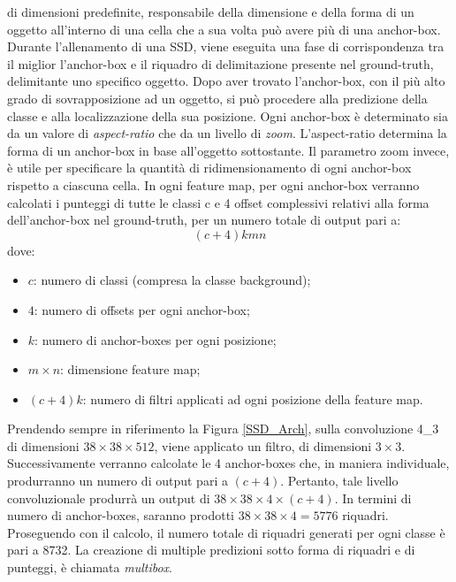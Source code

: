 di dimensioni predefinite, responsabile della dimensione e della forma di 
un oggetto all'interno di una cella che a sua volta può avere più di una 
anchor-box. Durante l'allenamento di una SSD, viene eseguita una fase 
di corrispondenza tra il miglior l'anchor-box e il riquadro di delimitazione 
presente nel ground-truth, delimitante uno specifico oggetto. Dopo aver 
trovato l'anchor-box, con il più alto grado di sovrapposizione ad un oggetto, 
si può procedere alla predizione della classe e alla localizzazione della sua 
posizione. Ogni anchor-box è determinato sia da un valore di \emph{aspect-ratio} che 
da un livello di \emph{zoom}. L'aspect-ratio determina la forma di un anchor-box in 
base all'oggetto sottostante. Il parametro zoom invece, è utile per specificare 
la quantità di ridimensionamento di ogni anchor-box rispetto a ciascuna 
cella. In ogni feature map, per ogni anchor-box verranno calcolati i punteggi 
di tutte le classi c e 4 offset complessivi relativi alla forma dell'anchor-box 
nel ground-truth, per un numero totale di output pari a:
\begin{equation}
    (c+4)kmn
\end{equation}
dove:
\begin{itemize}
    \item $c$: numero di classi (compresa la classe background);
    \item $4$: numero di offsets per ogni anchor-box;
    \item $k$: numero di anchor-boxes per ogni posizione;
    \item $m \times n$: dimensione feature map;
    \item $(c+4)k$: numero di filtri applicati ad ogni posizione della feature map.
\end{itemize}
Prendendo sempre in riferimento la Figura \ref{SSD_Arch}, sulla convoluzione 4\_3 
di dimensioni $38\times{38}\times{512}$, viene applicato un filtro, di dimensioni $3\times{3}$.
Successivamente verranno calcolate le 4 anchor-boxes che, in maniera 
individuale, produrranno un numero di output pari a $(c+4)$. Pertanto, 
tale livello convoluzionale produrrà un output di $38\times{38}\times{4}\times{(c+4)}$. In 
termini di numero di anchor-boxes, saranno prodotti $38\times{38}\times{4}=5776$ 
riquadri. Proseguendo con il calcolo, il numero totale di riquadri generati 
per ogni classe è pari a 8732. La creazione di multiple predizioni sotto 
forma di riquadri e di punteggi, è chiamata \emph{multibox}. 

